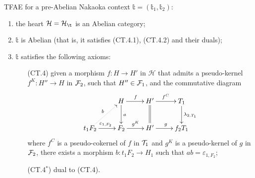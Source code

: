 \begin{thm}
TFAE for a pre-Abelian Nakaoka context $\mathbb{t}=(\mathbb{t}_1,\mathbb{t}_2)$:
\begin{enumerate}[label=(\alph*)]
\item the heart $\mathcal{H}=\H_\t$ is an Abelian category;
\item $\mathbb{t}$ is Abelian (that is, it satisfies (CT.4.1), (CT.4.2) and their duals);
\item $\mathbb{t}$ satisfies the following axioms:
\begin{itemize}
\item[(CT.4)] given a morphism $f\colon H\to H'$ in $\mathcal{H}$ that admits a pseudo-kernel $f^K\colon H''\to H$ in $\mathcal F_2$, such that $H''\in \mathcal F_1$, and the commutative diagram
\begin{equation*}
\xymatrix{
 & H\ar[d]^{a}\ar[r]^{f} & H'\ar@{=}[d]\ar[r]^{f^C} & T_1\ar[d]^{\lambda_{2,T_1}}\\
t_1F_2\ar@{.>}[ur]^{b}\ar[r]^{\varepsilon_{1,F_2}} & F_2\ar[r]^{g^K} & H'\ar[r]^{g} & f_2T_1
}
\end{equation*}
where $f^C$  is a pseudo-cokernel of $f$ in $\mathcal T_1$ and $g^K$ is a pseudo-kernel of $g$ in $\mathcal F_2$, there exists a morphism $b\colon t_1F_2\to H_1$ such that $ab=\varepsilon_{1,F_2}$;
\item[(CT.4$^*$)] dual to (CT.4).
\end{itemize}
\end{enumerate}
\end{thm}
